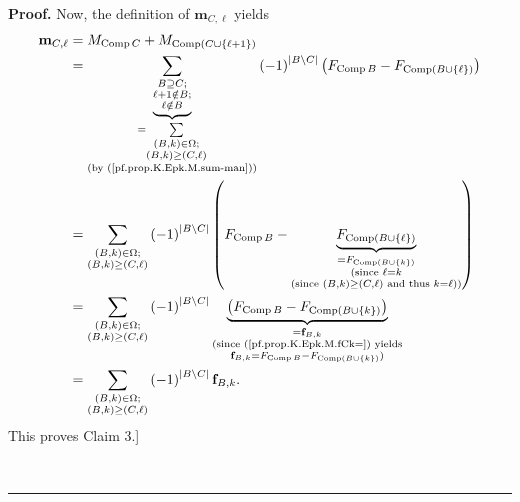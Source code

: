 \documentclass[numbers=enddot,12pt,final,onecolumn,notitlepage]{scrartcl}%
\theoremstyle{definition}
\newenvironment{proof}[1][Proof]{\noindent\textbf{#1.} }{\ \rule{0.5em}{0.5em}}
\newenvironment{verlong}{}{}
\let\sumnonlimits\sum
\renewcommand{\sum}{\sumnonlimits\limits}
\begin{document}
\begin{verlong}
\begin{proof}
Now, the definition of $\mathbf{m}_{C,\ell}$ yields%
\begin{align*}
\mathbf{m}_{C,\ell}  &  =M_{\operatorname*{Comp}C}+M_{\operatorname*{Comp}%
\left(  C\cup\left\{  \ell+1\right\}  \right)  }\\
&  =\underbrace{\sum_{\substack{B\supseteq C;\\\ell+1\notin B;\\\ell\notin
B}}}_{\substack{=\sum_{\substack{\left(  B,k\right)  \in\Omega;\\\left(
B,k\right)  \geq\left(  C,\ell\right)  }}\\\text{(by
(\ref{pf.prop.K.Epk.M.sum-man}))}}}\left(  -1\right)  ^{\left\vert B\setminus
C\right\vert }\left(  F_{\operatorname*{Comp}B}-F_{\operatorname*{Comp}\left(
B\cup\left\{  \ell\right\}  \right)  }\right) \\
&  =\sum_{\substack{\left(  B,k\right)  \in\Omega;\\\left(  B,k\right)
\geq\left(  C,\ell\right)  }}\left(  -1\right)  ^{\left\vert B\setminus
C\right\vert }\left(  F_{\operatorname*{Comp}B}%
-\underbrace{F_{\operatorname*{Comp}\left(  B\cup\left\{  \ell\right\}
\right)  }}_{\substack{=F_{\operatorname*{Comp}\left(  B\cup\left\{
k\right\}  \right)  }\\\text{(since }\ell=k\\\text{(since }\left(  B,k\right)
\geq\left(  C,\ell\right)  \text{ and thus }k=\ell\text{))}}}\right) \\
&  =\sum_{\substack{\left(  B,k\right)  \in\Omega;\\\left(  B,k\right)
\geq\left(  C,\ell\right)  }}\left(  -1\right)  ^{\left\vert B\setminus
C\right\vert }\underbrace{\left(  F_{\operatorname*{Comp}B}%
-F_{\operatorname*{Comp}\left(  B\cup\left\{  k\right\}  \right)  }\right)
}_{\substack{=\mathbf{f}_{B,k}\\\text{(since (\ref{pf.prop.K.Epk.M.fCk=})
yields}\\\mathbf{f}_{B,k}=F_{\operatorname*{Comp}B}-F_{\operatorname*{Comp}%
\left(  B\cup\left\{  k\right\}  \right)  }\text{)}}}\\
&  =\sum_{\substack{\left(  B,k\right)  \in\Omega;\\\left(  B,k\right)
\geq\left(  C,\ell\right)  }}\left(  -1\right)  ^{\left\vert B\setminus
C\right\vert }\mathbf{f}_{B,k}.
\end{align*}
This proves Claim 3.]


\end{proof}
\end{verlong}
\end{document}
